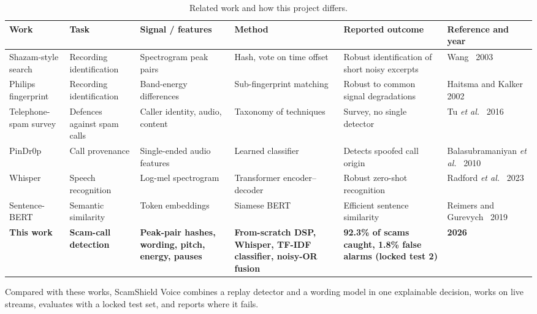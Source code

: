 \documentclass[letterpaper,12pt]{article}
\begin{document}
\begin{table}[H]
\caption{Related work and how this project differs.}
\vspace{6pt}
\footnotesize
\begin{tabular}{@{}p{1.9cm}p{2.3cm}p{2.7cm}p{2.9cm}p{3.1cm}p{2.5cm}@{}}
\toprule
Work & Task & Signal / features & Method & Reported outcome & Reference and year \\ \midrule
Shazam-style search & Recording identification & Spectrogram peak pairs & Hash, vote on time offset & Robust identification of short noisy excerpts & Wang~\cite{wang2003shazam} 2003 \\
\midrule
Philips fingerprint & Recording identification & Band-energy differences & Sub-fingerprint matching & Robust to common signal degradations & Haitsma and Kalker~\cite{haitsma2002fingerprint} 2002 \\
\midrule
Telephone-spam survey & Defences against spam calls & Caller identity, audio, content & Taxonomy of techniques & Survey, no single detector & Tu \emph{et al.}~\cite{tu2016sok} 2016 \\
\midrule
PinDr0p & Call provenance & Single-ended audio features & Learned classifier & Detects spoofed call origin & Balasubramaniyan \emph{et al.}~\cite{balasubramaniyan2010pindrop} 2010 \\
\midrule
Whisper & Speech recognition & Log-mel spectrogram & Transformer encoder--decoder & Robust zero-shot recognition & Radford \emph{et al.}~\cite{radford2023whisper} 2023 \\
\midrule
Sentence-BERT & Semantic similarity & Token embeddings & Siamese BERT & Efficient sentence similarity & Reimers and Gurevych~\cite{reimers2019sbert} 2019 \\
\midrule
\textbf{This work} & \textbf{Scam-call detection} & \textbf{Peak-pair hashes, wording, pitch, energy, pauses} & \textbf{From-scratch DSP, Whisper, TF-IDF classifier, noisy-OR fusion} & \textbf{92.3\% of scams caught, 1.8\% false alarms (locked test 2)} & \textbf{2026} \\
\bottomrule
\end{tabular}
\end{table}

Compared with these works, ScamShield Voice combines a replay detector and a wording model in one explainable decision, works on live streams, evaluates with a locked test set, and reports where it fails.
\end{document}
